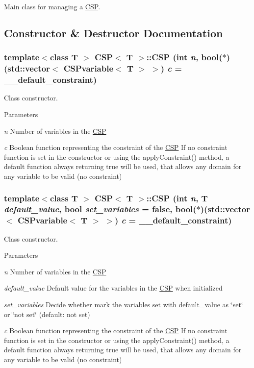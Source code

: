 Main class for managing a \hyperlink{classCSP}{CSP}. 

\subsection{Constructor \& Destructor Documentation}
\hypertarget{classCSP_ad49548121582cc2d59e0d7f100092b75}{
\subsubsection[{CSP}]{\setlength{\rightskip}{0pt plus 5cm}template$<$class T $>$ {\bf CSP}$<$ T $>$::{\bf CSP} (int {\em n}, \/  bool($\ast$)(std::vector$<$ {\bf CSPvariable}$<$ T $>$ $>$) {\em c} = {\ttfamily \_\-\_\-default\_\-constraint})}}
\label{classCSP_ad49548121582cc2d59e0d7f100092b75}


Class constructor. 


\begin{DoxyParams}{Parameters}
\item[{\em n}]Number of variables in the \hyperlink{classCSP}{CSP} \item[{\em c}]Boolean function representing the constraint of the \hyperlink{classCSP}{CSP} If no constraint function is set in the constructor or using the applyConstraint() method, a default function always returning true will be used, that allows any domain for any variable to be valid (no constraint) \end{DoxyParams}
\hypertarget{classCSP_a734bb08d8f45394a2acfc8822981a6d0}{
\subsubsection[{CSP}]{\setlength{\rightskip}{0pt plus 5cm}template$<$class T $>$ {\bf CSP}$<$ T $>$::{\bf CSP} (int {\em n}, \/  T {\em default\_\-value}, \/  bool {\em set\_\-variables} = {\ttfamily false}, \/  bool($\ast$)(std::vector$<$ {\bf CSPvariable}$<$ T $>$ $>$) {\em c} = {\ttfamily \_\-\_\-default\_\-constraint})}}
\label{classCSP_a734bb08d8f45394a2acfc8822981a6d0}


Class constructor. 


\begin{DoxyParams}{Parameters}
\item[{\em n}]Number of variables in the \hyperlink{classCSP}{CSP} \item[{\em default\_\-value}]Default value for the variables in the \hyperlink{classCSP}{CSP} when initialized \item[{\em set\_\-variables}]Decide whether mark the variables set with default\_\-value as \char`\"{}set\char`\"{} or \char`\"{}not set\char`\"{} (default: not set) \item[{\em c}]Boolean function representing the constraint of the \hyperlink{classCSP}{CSP} If no constraint function is set in the constructor or using the applyConstraint() method, a default function always returning true will be used, that allows any domain for any variable to be valid (no constraint) \end{DoxyParams}



